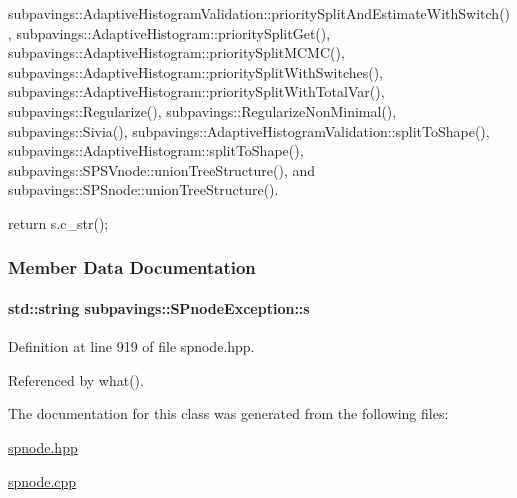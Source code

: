subpavings\-::\-Adaptive\-Histogram\-Validation\-::priority\-Split\-And\-Estimate\-With\-Switch(), subpavings\-::\-Adaptive\-Histogram\-::priority\-Split\-Get(), subpavings\-::\-Adaptive\-Histogram\-::priority\-Split\-M\-C\-M\-C(), subpavings\-::\-Adaptive\-Histogram\-::priority\-Split\-With\-Switches(), subpavings\-::\-Adaptive\-Histogram\-::priority\-Split\-With\-Total\-Var(), subpavings\-::\-Regularize(), subpavings\-::\-Regularize\-Non\-Minimal(), subpavings\-::\-Sivia(), subpavings\-::\-Adaptive\-Histogram\-Validation\-::split\-To\-Shape(), subpavings\-::\-Adaptive\-Histogram\-::split\-To\-Shape(), subpavings\-::\-S\-P\-S\-Vnode\-::union\-Tree\-Structure(), and subpavings\-::\-S\-P\-Snode\-::union\-Tree\-Structure().


\begin{DoxyCode}
{ return s.c_str(); }
\end{DoxyCode}


\subsubsection{\-Member \-Data \-Documentation}
\hypertarget{classsubpavings_1_1SPnodeException_ad6356fcb207cb052e9c897f317a64547}{
\paragraph[{s}]{\setlength{\rightskip}{0pt plus 5cm}std\-::string {\bf subpavings\-::\-S\-Pnode\-Exception\-::s}}}\label{classsubpavings_1_1SPnodeException_ad6356fcb207cb052e9c897f317a64547}


\-Definition at line 919 of file spnode.\-hpp.



\-Referenced by what().



\-The documentation for this class was generated from the following files\-:\begin{DoxyCompactItemize}
\item 
\hyperlink{spnode_8hpp}{spnode.\-hpp}\item 
\hyperlink{spnode_8cpp}{spnode.\-cpp}\end{DoxyCompactItemize}
